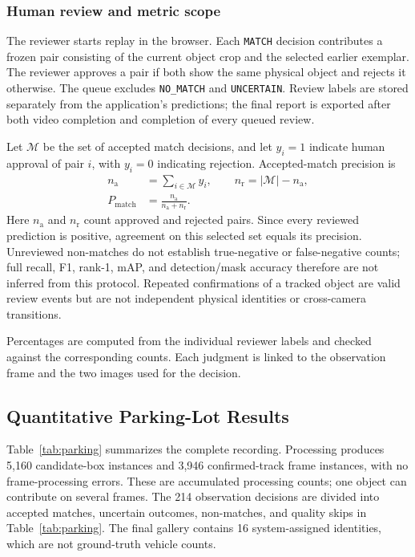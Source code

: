 \documentclass[conference]{IEEEtran}
\begin{document}
\subsubsection{Human review and metric scope}
The reviewer starts replay in the browser. Each \texttt{MATCH} decision contributes a frozen pair consisting of the current object crop and the selected earlier exemplar. The reviewer approves a pair if both show the same physical object and rejects it otherwise. The queue excludes \texttt{NO\_MATCH} and \texttt{UNCERTAIN}. Review labels are stored separately from the application's predictions; the final report is exported after both video completion and completion of every queued review.

Let $\mathcal M$ be the set of accepted match decisions, and let $y_i=1$ indicate human approval of pair $i$, with $y_i=0$ indicating rejection. Accepted-match precision is
\begin{equation}
\begin{aligned}
n_{\mathrm{a}}&=\sum_{i\in\mathcal M}y_i,\qquad
n_{\mathrm{r}}=|\mathcal M|-n_{\mathrm{a}},\\
P_{\mathrm{match}}&=\frac{n_{\mathrm{a}}}{n_{\mathrm{a}}+n_{\mathrm{r}}}.
\end{aligned}
\label{eq:review}
\end{equation}
Here $n_{\mathrm{a}}$ and $n_{\mathrm{r}}$ count approved and rejected pairs. Since every reviewed prediction is positive, agreement on this selected set equals its precision. Unreviewed non-matches do not establish true-negative or false-negative counts; full recall, F1, rank-1, mAP, and detection/mask accuracy therefore are not inferred from this protocol. Repeated confirmations of a tracked object are valid review events but are not independent physical identities or cross-camera transitions.

Percentages are computed from the individual reviewer labels and checked against the corresponding counts. Each judgment is linked to the observation frame and the two images used for the decision.

\subsection{Quantitative Parking-Lot Results}
Table~\ref{tab:parking} summarizes the complete recording. Processing produces 5,160 candidate-box instances and 3,946 confirmed-track frame instances, with no frame-processing errors. These are accumulated processing counts; one object can contribute on several frames. The 214 observation decisions are divided into accepted matches, uncertain outcomes, non-matches, and quality skips in Table~\ref{tab:parking}. The final gallery contains 16 system-assigned identities, which are not ground-truth vehicle counts.
\end{document}
